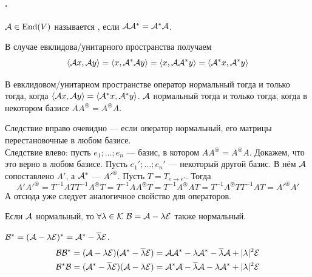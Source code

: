\documentclass{article}
\newcommand*{\id}{{\scriptE}}
\begin{document}
    \paragraph{.}
    \begin{itemize}
        \dfn ${\mathcal{A}}\in\operatorname{End}(V)$ называется , если ${\mathcal{A}}{\mathcal{A}}^*={\mathcal{A}}^*{\mathcal{A}}$.
        \begin{Comment}
            В случае евклидова/унитарного пространства получаем
            \[
            {\left\langle{{\mathcal{A}}x},{{\mathcal{A}} y}\right\rangle}={\left\langle{x},{{\mathcal{A}}^*{\mathcal{A}} y}\right\rangle}={\left\langle{x},{{\mathcal{A}}{\mathcal{A}}^*y}\right\rangle}={\left\langle{{\mathcal{A}}^*x},{{\mathcal{A}}^*y}\right\rangle}
            \]
        \end{Comment}
        \thm В евклидовом/унитарном пространстве оператор нормальный тогда и только тогда, когда ${\left\langle{{\mathcal{A}}x},{{\mathcal{A}} y}\right\rangle}={\left\langle{{\mathcal{A}}^*x},{{\mathcal{A}}^*y}\right\rangle}$.
        \thm ${\mathcal{A}}$ нормальный тогда и только тогда, когда в некотором базисе $AA^\circledast=A^\circledast A$.
        \begin{Proof}
            Следствие вправо очевидно --- если оператор нормальный, его матрицы перестановочные в любом базисе.\\
            Следствие влево: пусть $e_1;\ldots;e_n$ --- базис, в котором $AA^\circledast=A^\circledast A$. Докажем, что это верно в любом базисе. Пусть $e_1';\ldots;e_n'$ --- некоторый другой базис. В нём ${\mathcal{A}}$ сопоставлено $A'$, а ${\mathcal{A}}^*$ --- ${A'}^\circledast$. Пусть $T=T_{e\to e'}$. Тогда
            $$
            A'{A'}^\circledast=T^{-1}ATT^{-1}A^\circledast T=T^{-1}AA^\circledast T=T^{-1}A^\circledast AT=T^{-1}A^\circledast TT^{-1}AT={A'}^\circledast A'
            $$
            А отсюда уже следует аналогичное свойство для операторов.
        \end{Proof}
        \thm Если ${\mathcal{A}}$ нормальный, то $\forall\lambda\in\scriptK~\scriptB=\scriptA-\lambda\id$ также нормальный.
        \begin{Proof}
            $\scriptB^*=(\scriptA-\lambda\id)^*=\scriptA^*-\overline\lambda\id$.\\
            \[\begin{split}
                \scriptB\scriptB^*&=(\scriptA-\lambda\id)(\scriptA^*-\overline\lambda\id)=\scriptA\scriptA^*-\lambda\scriptA^*-\overline\lambda\scriptA+|\lambda|^2\id\\
                \scriptB^*\scriptB&=(\scriptA^*-\overline\lambda\id)(\scriptA-\lambda\id)=\scriptA^*\scriptA-\overline\lambda\scriptA-\lambda\scriptA^*+|\lambda|^2\id

\end{split}\]
\end{Proof}
\end{itemize}
\end{document}
